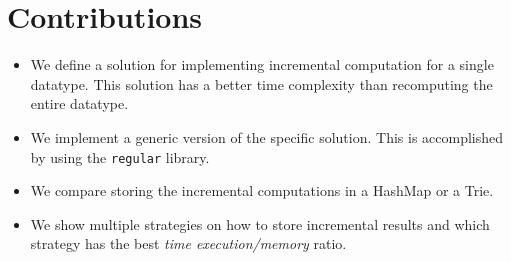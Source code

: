 \section{Contributions}
\begin{itemize}
    \item We define a solution for implementing incremental computation for a single datatype. This solution has a better time complexity than recomputing the entire datatype.
    \item We implement a generic version of the specific solution. This is accomplished by using the \texttt{regular} library.
    \item We compare storing the incremental computations in a HashMap or a Trie.
    \item We show multiple strategies on how to store incremental results and which strategy has the best \textit{time execution/memory} ratio. %
\end{itemize}